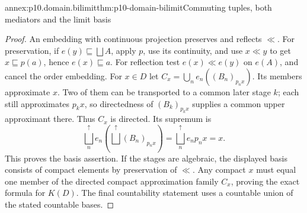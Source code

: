 \begin{annexitem}{annex:p10.domain.bilimit}{thm:p10-domain-bilimit}{Commuting tuples, both mediators and the limit basis}
\begin{proof}
An embedding with continuous projection preserves and reflects
\(\ll\). For preservation, if \(e(y)\sqsubseteq\bigsqcup A\),
apply \(p\), use its continuity, and use \(x\ll y\) to
get \(x\sqsubseteq p(a)\), hence \(e(x)\sqsubseteq a\).
For reflection test \(e(x)\ll e(y)\) on \(e(A)\), and
cancel the order embedding.
For \(x\in D\) let
\(C_x=\bigcup_ne_n((B_n)_{p_nx})\).
Its members approximate \(x\). Two of them can be transported
to a common later stage \(k\); each still approximates \(p_kx\),
so directedness of \((B_k)_{p_kx}\) supplies a common upper
approximant there. Thus \(C_x\) is directed. Its supremum is
\[
 \bigsqcup_n^{\uparrow}e_n
       (\bigsqcup^{\uparrow}(B_n)_{p_nx})
         =\bigsqcup_n^{\uparrow}e_np_nx=x.
\]
This proves the basis assertion. If the stages are algebraic,
the displayed basis consists of compact elements by preservation
of \(\ll\). Any compact \(x\) must equal one member of
the directed compact approximation family \(C_x\), proving
the exact formula for \(K(D)\). The final countability statement
uses a countable union of the stated countable bases.
\end{proof}
\end{annexitem}

